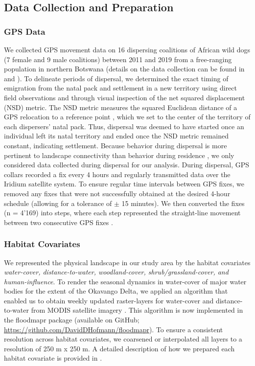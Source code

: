 \documentclass[abstract=on,10pt,a4paper,bibliography=totocnumbered]{article}
\begin{document}
\subsection{Data Collection and Preparation}
\subsubsection{GPS Data}
We collected GPS movement data on 16 dispersing coalitions of African wild dogs
(7 female and 9 male coalitions) between 2011 and 2019 from a free-ranging
population in northern Botswana (details on the data collection can be found in
\cite{Cozzi.2020} and \cite{Hofmann.2021}). To delineate periods of dispersal,
we determined the exact timing of emigration from the natal pack and settlement
in a new territory using direct field observations and through visual inspection
of the net squared displacement (NSD) metric. The NSD metric measures the
squared Euclidean distance of a GPS relocation to a reference point
\citep{Borger.2012}, which we set to the center of the territory of each
dispersers' natal pack. Thus, dispersal was deemed to have started once an
individual left its natal territory and ended once the NSD metric remained
constant, indicating settlement. Because behavior during dispersal is more
pertinent to landscape connectivity than behavior during residence
\citep{Elliot.2014, Abrahms.2017}, we only considered data collected during
dispersal for our analysis. During dispersal, GPS collars recorded a fix every 4
hours and regularly transmitted data over the Iridium satellite system. To
ensure regular time intervals between GPS fixes, we removed any fixes that were
not successfully obtained at the desired 4-hour schedule (allowing for a
tolerance of \( \pm \) 15 minutes). We then converted the fixes (n = 4'169) into
steps, where each step represented the straight-line movement between two
consecutive GPS fixes \citep{Turchin.1998}.

\subsubsection{Habitat Covariates}
We represented the physical landscape in our study area by the habitat
covariates \textit{water-cover, distance-to-water, woodland-cover,
shrub/grassland-cover, and human-influence}. To render the seasonal dynamics in
water-cover of major water bodies for the extent of the Okavango Delta, we
applied an algorithm that enabled us to obtain weekly updated raster-layers for
water-cover and distance-to-water from MODIS satellite imagery
\citep{Wolski.2017, Hofmann.2021}. This algorithm is now implemented in the
\textsf{floodmapr} package (available on GitHub;
\url{https://github.com/DavidDHofmann/floodmapr}). To ensure a consistent
resolution across habitat covariates, we coarsened or interpolated all layers to
a resolution of 250 m x 250 m. A detailed description of how we prepared each
habitat covariate is provided in \cite{Hofmann.2021}.
\end{document}
